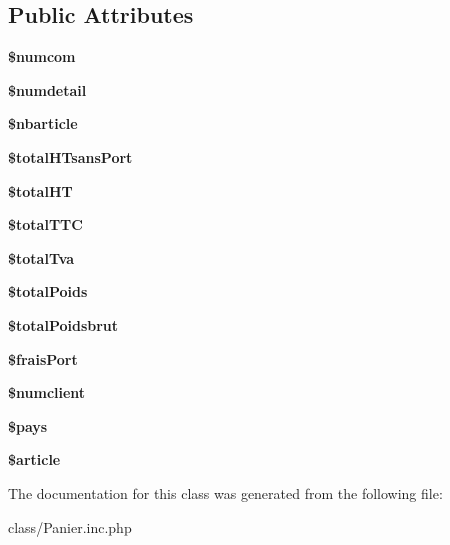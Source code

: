 \subsection*{Public Attributes}
\begin{DoxyCompactItemize}
\item 
\hypertarget{class_panier_a6b89bba3f16b5c31864aa0444a89001e}{
{\bfseries \$numcom}}
\label{class_panier_a6b89bba3f16b5c31864aa0444a89001e}

\item 
\hypertarget{class_panier_adc9a128d4e932601b65b165f7469586f}{
{\bfseries \$numdetail}}
\label{class_panier_adc9a128d4e932601b65b165f7469586f}

\item 
\hypertarget{class_panier_af45d9e0bedac54b40aa5a941ec51cdfb}{
{\bfseries \$nbarticle}}
\label{class_panier_af45d9e0bedac54b40aa5a941ec51cdfb}

\item 
\hypertarget{class_panier_a57c506a09acfe359baeee46798090921}{
{\bfseries \$totalHTsansPort}}
\label{class_panier_a57c506a09acfe359baeee46798090921}

\item 
\hypertarget{class_panier_a1416512c95d55b2bf0e46e4542f06e23}{
{\bfseries \$totalHT}}
\label{class_panier_a1416512c95d55b2bf0e46e4542f06e23}

\item 
\hypertarget{class_panier_a052adc7efe6edb33304235fc168d2ccb}{
{\bfseries \$totalTTC}}
\label{class_panier_a052adc7efe6edb33304235fc168d2ccb}

\item 
\hypertarget{class_panier_ad9b15d80a991862c41b2079631daa2d0}{
{\bfseries \$totalTva}}
\label{class_panier_ad9b15d80a991862c41b2079631daa2d0}

\item 
\hypertarget{class_panier_a6a6027837169112ec3920cd0c1d69c6e}{
{\bfseries \$totalPoids}}
\label{class_panier_a6a6027837169112ec3920cd0c1d69c6e}

\item 
\hypertarget{class_panier_ab593a2536b7843e460726460f24159df}{
{\bfseries \$totalPoidsbrut}}
\label{class_panier_ab593a2536b7843e460726460f24159df}

\item 
\hypertarget{class_panier_a55070dca6e7e6a71b8d7a1ba4f18ab1c}{
{\bfseries \$fraisPort}}
\label{class_panier_a55070dca6e7e6a71b8d7a1ba4f18ab1c}

\item 
\hypertarget{class_panier_a050a6074587b545ee121f82c9786195b}{
{\bfseries \$numclient}}
\label{class_panier_a050a6074587b545ee121f82c9786195b}

\item 
\hypertarget{class_panier_ab567bc3962fd0a4d3004d5dfd1463f11}{
{\bfseries \$pays}}
\label{class_panier_ab567bc3962fd0a4d3004d5dfd1463f11}

\item 
\hypertarget{class_panier_a66b2dd51d1d51e3ff19cd240197fe62f}{
{\bfseries \$article}}
\label{class_panier_a66b2dd51d1d51e3ff19cd240197fe62f}

\end{DoxyCompactItemize}


The documentation for this class was generated from the following file:\begin{DoxyCompactItemize}
\item 
class/Panier.inc.php\end{DoxyCompactItemize}
